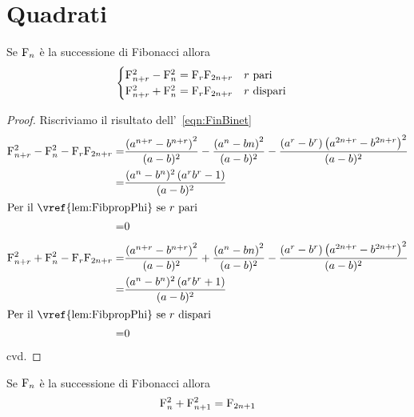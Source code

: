 \section{Quadrati}
\begin{thm}\label{thm:Fibsommsdifferenzaquadrati}
	Se $\mathrm{F}_{n}$ è la successione di Fibonacci allora 
	\begin{equation}
		\begin{cases}
			\mathrm{F}_{n+r}^2-\mathrm{F}_{n}^2={}\mathrm{F}_{r}\mathrm{F}_{2n+r}\quad\text{$r$ pari}\\
			\mathrm{F}_{n+r}^2+\mathrm{F}_{n}^2={}\mathrm{F}_{r}\mathrm{F}_{2n+r}\quad\text{$r$ dispari}\\
		\end{cases}
	\end{equation}
\end{thm}
\begin{proof}
		Riscriviamo il risultato dell'~\vref{eqn:FinBinet}
		\begin{align*}
			\Fib{n+r}^2-\Fib{n}^2-\Fib{r}\Fib{2n+r}
			=&\dfrac{\left(a^{n+r}-b^{n+r}\right)^2}{(a-b)^2}
			-\dfrac{\left(a^{n}-b{n}\right)^2}{(a-b)^2}
			-\dfrac{(a^r-b^r)\left(a^{2n+r}-b^{2n+r}\right)^2}{(a-b)^2}\\
			=&\dfrac{(a^n-b^n)^2\left(a^rb^r-1 \right)}{(a-b)^2}\\
			\intertext{Per il~\vref{lem:FibpropPhi} se $r$ pari}
			=&0\\
		\end{align*}
	\begin{align*}
		\Fib{n+r}^2+\Fib{n}^2-\Fib{r}\Fib{2n+r}
		=&\dfrac{\left(a^{n+r}-b^{n+r}\right)^2}{(a-b)^2}
		+\dfrac{\left(a^{n}-b{n}\right)^2}{(a-b)^2}
		-\dfrac{(a^r-b^r)\left(a^{2n+r}-b^{2n+r}\right)^2}{(a-b)^2}\\
		=&\dfrac{(a^n-b^n)^2\left(a^rb^r+1 \right)}{(a-b)^2}\\
		\intertext{Per il~\vref{lem:FibpropPhi} se $r$ dispari}
		=&0\\
	\end{align*}
cvd.
\end{proof}
\begin{thm}\label{thm:Fibdispari}
	Se $\mathrm{F}_{n}$ è la successione di Fibonacci allora 
	\begin{equation}
		\mathrm{F}_{n}^2+\mathrm{F}_{n+1}^2=\mathrm{F}_{2n+1}
	\end{equation}\label{eqn:FibDispari}
\end{thm}
